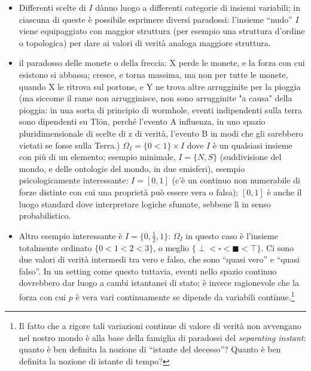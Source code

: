 \documentclass{amsart}
\begin{document}
\begin{itemize}
  \item Differenti scelte di $I$ dànno luogo a differenti categorie di insiemi variabili; in ciascuna di queste è possibile esprimere diversi paradossi: l'insieme ``nudo'' $I$  viene equipaggiato con maggior struttura (per esempio una struttura d'ordine o topologica) per dare ai valori di verità analoga maggiore struttura.

  \item il paradosso delle monete o della freccia: X perde le monete, e la forza con cui esistono si abbassa; cresce, e torna massima, ma non per tutte le monete, quando X le ritrova sul portone,  e Y ne trova altre arrugginite per la pioggia (ma siccome il rame non arrugginisce, non sono arrugginite "a causa" della pioggia: in una sorta di principio di wormhole, eventi indipendenti sulla terra sono dipendenti su Tlön, perché l'evento A influenza, in uno spazio pluridimensionale di scelte di z di verità, l'evento B in modi che gli sarebbero vietati se fosse sulla Terra.) $\Omega_I = \{0<1\}\times I$ dove $I$ è un qualsiasi insieme con più di un elemento; esempio minimale, $I=\{N,S\}$ (suddivisione del mondo, e delle ontologie del mondo, in due emisferi), esempio psicologicamente interessante: $I=[0,1]$ (c'è un continuo non numerabile di forze distinte con cui una proprietà può essere vera o falsa); $[0,1]$ è anche il luogo standard dove interpretare logiche sfumate, sebbene lì in senso probabilistico.
  \item Altro esempio interessante è $I=\{0,\frac{1}{2}, 1\}$: $\Omega_I$ in questo caso è l'insieme totalmente ordinato $\{0<1<2<3\}$, o meglio $\{\perp <  \square < \blacksquare < \top\}$. Ci sono due valori di verità intermedi tra vero e falso, che sono ``quasi vero'' e ``quasi falso''. In un setting come questo tuttavia, eventi nello spazio continuo dovrebbero dar luogo a cambi istantanei di stato; è invece ragionevole che la forza con cui $p$ è vera vari continuamente se dipende da variabili continue.\footnote{Il fatto che a rigore tali variazioni continue di valore di verità non avvengano nel nostro mondo è alla base della famiglia di paradossi del \emph{separating instant}: quanto è ben definita la nozione di ``istante del decesso''? Quanto è ben definita la nozione di istante di tempo?}


\end{itemize}
\end{document}
